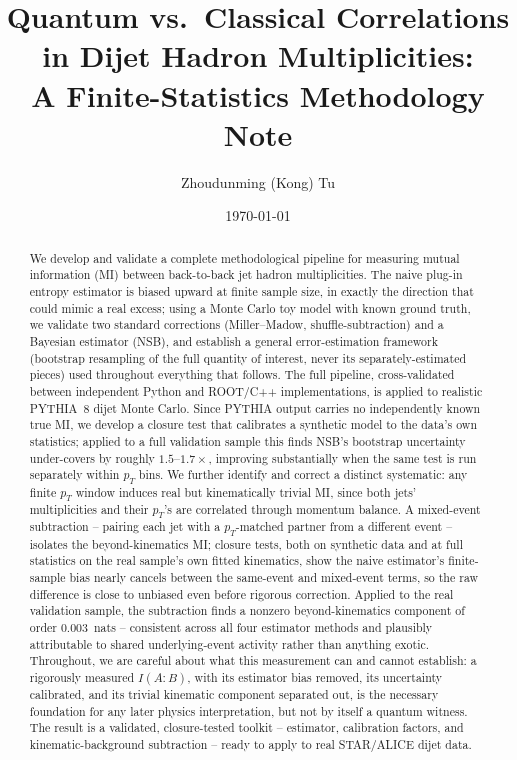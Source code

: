 \documentclass[11pt]{article}
\title{Quantum vs.\ Classical Correlations in Dijet Hadron Multiplicities:\\
A Finite-Statistics Methodology Note}
\author[1,2]{Zhoudunming (Kong) Tu}
\affil[1]{Brookhaven National Laboratory}
\affil[2]{Stony Brook University}
\date{\today}
\begin{document}
\maketitle

\begin{abstract}
\noindent
We develop and validate a complete methodological pipeline for measuring
mutual information (MI) between back-to-back jet hadron multiplicities.
The naive plug-in entropy estimator is biased upward at finite sample
size, in exactly the direction that could mimic a real excess; using a
Monte Carlo toy model with known ground truth, we validate two standard
corrections (Miller--Madow, shuffle-subtraction) and a Bayesian
estimator (NSB), and establish a general error-estimation framework
(bootstrap resampling of the full quantity of interest, never its
separately-estimated pieces) used throughout everything that follows.
The full pipeline, cross-validated between independent Python and
ROOT/C++ implementations, is applied to realistic PYTHIA~8 dijet Monte
Carlo. Since PYTHIA output carries no independently known true MI, we
develop a closure test that calibrates a synthetic model to the data's
own statistics; applied to a full validation sample this finds NSB's
bootstrap uncertainty under-covers by roughly $1.5$--$1.7\times$,
improving substantially when the same test is run separately within
$p_T$ bins. We further identify and correct a distinct systematic: any
finite $p_T$ window induces real but kinematically trivial MI, since
both jets' multiplicities and their $p_T$'s are correlated through
momentum balance. A mixed-event subtraction -- pairing each jet with a
$p_T$-matched partner from a different event -- isolates the
beyond-kinematics MI; closure tests, both on synthetic data and at full
statistics on the real sample's own fitted kinematics, show the naive
estimator's finite-sample bias nearly cancels between the same-event and
mixed-event terms, so the raw difference is close to unbiased even
before rigorous correction. Applied to the real validation sample, the
subtraction finds a nonzero beyond-kinematics component of order
$0.003$~nats -- consistent across all four estimator methods and
plausibly attributable to shared underlying-event activity rather than
anything exotic. Throughout, we are careful about what this measurement
can and cannot establish: a rigorously measured $I(A{:}B)$, with its
estimator bias removed, its uncertainty calibrated, and its trivial
kinematic component separated out, is the necessary foundation for any
later physics interpretation, but not by itself a quantum witness. The
result is a validated, closure-tested toolkit -- estimator, calibration
factors, and kinematic-background subtraction -- ready to apply to real
STAR/ALICE dijet data.
\end{abstract}
\end{document}

